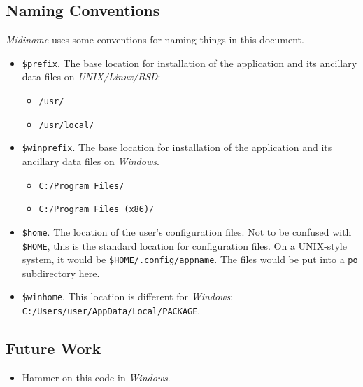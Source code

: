 \documentclass[
 11pt,
 twoside,
 a4paper,
 final                                 %
]{article}
\begin{document}
\subsection{Naming Conventions}
\label{subsec:introduction_conventions}

   \textsl{Midiname} uses some conventions for naming things in this
   document.

   \begin{itemize}
      \item \texttt{\$prefix}. The base location for installation of
         the application and its ancillary data files on
         \textsl{UNIX/Linux/BSD}:
         \begin{itemize}
            \item \texttt{/usr/}
            \item \texttt{/usr/local/}
         \end{itemize}
      \item \texttt{\$winprefix}. The base location for installation of
         the application and its ancillary data files on \textsl{Windows}.
         \begin{itemize}
            \item \texttt{C:/Program Files/}
            \item \texttt{C:/Program Files (x86)/}
         \end{itemize}
      \item \texttt{\$home}. The location of the user's configuration files.
         Not to be confused with \texttt{\$HOME}, this is
         the standard location for configuration files.
         On a UNIX-style system, it would be \linebreak
         \texttt{\$HOME/.config/appname}.
         The files would be put into a \texttt{po} subdirectory here.
      \item \texttt{\$winhome}. This location is different for
         \textsl{Windows}:
         \texttt{C:/Users/user/AppData/Local/PACKAGE}.
   \end{itemize}

\subsection{Future Work}
\label{subsec:introduction_future}

   \begin{itemize}
      \item Hammer on this code in \textsl{Windows}.
   \end{itemize}
\end{document}
